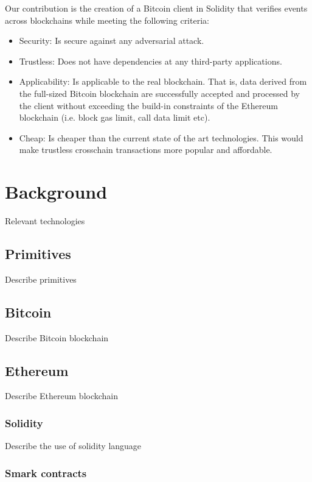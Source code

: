 \documentclass{article}
\begin{document}
  Our contribution is the creation of a Bitcoin client in Solidity that
  verifies events across blockchains while meeting the following
  criteria:
  \begin{itemize}
  \item
    Security: Is secure against any adversarial attack.
  \item
    Trustless: Does not have dependencies at any third-party
    applications.
  \item
    Applicability: Is applicable to the real blockchain. That is, data
    derived from the full-sized Bitcoin blockchain are successfully
    accepted and processed by the client without exceeding the build-in
    constraints of the Ethereum blockchain (i.e. block gas limit, call
    data limit etc).
  \item
    Cheap: Is cheaper than the current state of the art technologies.
    This would make trustless crosschain transactions more popular and
    affordable.
  \end{itemize}

  \section{Background}

  Relevant technologies

  \subsection{Primitives}

  Describe primitives

  \subsection{Bitcoin}

  Describe Bitcoin blockchain

  \subsection{Ethereum}

  Describe Ethereum blockchain

  \subsubsection{Solidity}

  Describe the use of solidity language

  \subsubsection{Smark contracts}
\end{document}
